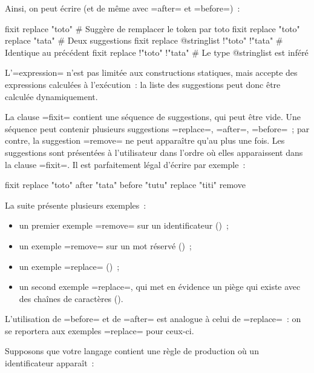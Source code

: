 Ainsi, on peut écrire (et de même avec \ggs=after= et \ggs=before=)~:
\begin{galgas}
fixit { replace "toto" } # Suggère de remplacer le token par toto
fixit { replace "toto" replace "tata" } # Deux suggestions
fixit { replace @stringlist {!"toto" !"tata"} } # Identique au précédent
fixit { replace {!"toto" !"tata"} } # Le type @stringlist est inféré
\end{galgas}


L'\ggs=expression= n'est pas limitée aux constructions statiques, mais accepte des expressions calculées à l'exécution~: la liste des suggestions peut donc être calculée dynamiquement.

La clause \ggs=fixit= contient une séquence de suggestions, qui peut être vide. Une séquence peut contenir plusieurs suggestions \ggs=replace=, \ggs=after=, \ggs=before=~; par contre, la suggestion \ggs=remove= ne peut apparaître qu'au plus une fois. Les suggestions sont présentées à l'utilisateur dans l'ordre où elles apparaissent dans la clause \ggs=fixit=. Il est parfaitement légal d'écrire par exemple~:
\begin{galgas}
fixit {
  replace "toto"
  after "tata"
  before "tutu"
  replace "titi"
  remove
}
\end{galgas}


La suite présente plusieurs exemples~:
\begin{itemize}
  \item un premier exemple \ggs=remove= sur un identificateur ()~;
  \item un exemple  \ggs=remove= sur un mot réservé ()~;
  \item un exemple \ggs=replace= ()~;
  \item un second exemple \ggs=replace=, qui met en évidence un piège qui existe avec des chaînes de caractères ().
\end{itemize}

L'utilisation de \ggs=before= et de \ggs=after= est analogue à celui de \ggs=replace=~: on se reportera aux exemples \ggs=replace= pour ceux-ci.



Supposons que votre langage contient une règle de production où un identificateur apparaît~:

